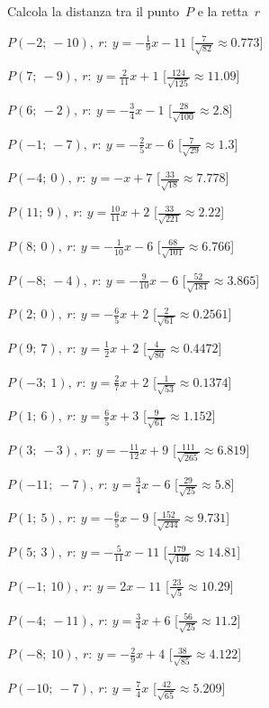 \begin{esercizio}\label{ese:}
 Calcola la distanza tra il punto~$P$ e la retta~$r$
 \begin{enumeratea}
  \item  $P(-2;~-10),~r:~y = -\frac{1}{9} x -11$ \hfill 
   [$\frac{7}{\sqrt{82}}\approx 0.773$]
  \item  $P(7;~-9),~r:~y = \frac{2}{11} x +1$ \hfill 
   [$\frac{124}{\sqrt{125}}\approx 11.09$]
  \item  $P(6;~-2),~r:~y = -\frac{3}{4} x -1$ \hfill 
   [$\frac{28}{\sqrt{100}}\approx   2.8$]
  \item  $P(-1;~-7),~r:~y = -\frac{2}{5} x -6$ \hfill 
   [$\frac{7}{\sqrt{29}}\approx   1.3$]
  \item  $P(-4;~0),~r:~y = - x +7$ \hfill 
   [$\frac{33}{\sqrt{18}}\approx 7.778$]
  \item  $P(11;~9),~r:~y = \frac{10}{11} x +2$ \hfill 
   [$\frac{33}{\sqrt{221}}\approx  2.22$]
  \item  $P(8;~0),~r:~y = -\frac{1}{10} x -6$ \hfill 
   [$\frac{68}{\sqrt{101}}\approx 6.766$]
  \item  $P(-8;~-4),~r:~y = -\frac{9}{10} x -6$ \hfill 
   [$\frac{52}{\sqrt{181}}\approx 3.865$]
  \item  $P(2;~0),~r:~y = -\frac{6}{5} x +2$ \hfill 
   [$\frac{2}{\sqrt{61}}\approx0.2561$]
  \item  $P(9;~7),~r:~y = \frac{1}{2} x +2$ \hfill 
   [$\frac{4}{\sqrt{80}}\approx0.4472$]
  \item  $P(-3;~1),~r:~y = \frac{2}{7} x +2$ \hfill 
   [$\frac{1}{\sqrt{53}}\approx0.1374$]
  \item  $P(1;~6),~r:~y = \frac{6}{5} x +3$ \hfill 
   [$\frac{9}{\sqrt{61}}\approx 1.152$]
  \item  $P(3;~-3),~r:~y = -\frac{11}{12} x +9$ \hfill 
   [$\frac{111}{\sqrt{265}}\approx 6.819$]
  \item  $P(-11;~-7),~r:~y = \frac{3}{4} x -6$ \hfill 
   [$\frac{29}{\sqrt{25}}\approx   5.8$]
  \item  $P(1;~5),~r:~y = -\frac{6}{5} x -9$ \hfill 
   [$\frac{152}{\sqrt{244}}\approx 9.731$]
  \item  $P(5;~3),~r:~y = -\frac{5}{11} x -11$ \hfill 
   [$\frac{179}{\sqrt{146}}\approx 14.81$]
  \item  $P(-1;~10),~r:~y = 2 x -11$ \hfill 
   [$\frac{23}{\sqrt{5}}\approx 10.29$]
  \item  $P(-4;~-11),~r:~y = \frac{3}{4} x +6$ \hfill 
   [$\frac{56}{\sqrt{25}}\approx  11.2$]
  \item  $P(-8;~10),~r:~y = -\frac{2}{9} x +4$ \hfill 
   [$\frac{38}{\sqrt{85}}\approx 4.122$]
  \item  $P(-10;~-7),~r:~y = \frac{7}{4} x $ \hfill 
   [$\frac{42}{\sqrt{65}}\approx 5.209$]
 \end{enumeratea}
\end{esercizio}

